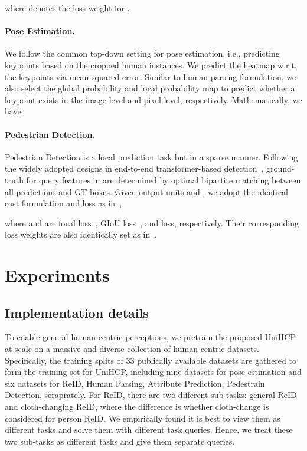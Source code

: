 \documentclass[10pt,twocolumn,letterpaper]{article}
\begin{document}
where  denotes the loss weight for .


\paragraph{Pose Estimation.}
We follow the common top-down setting for pose estimation, i.e., predicting keypoints based on the cropped human instances. We predict the heatmap w.r.t. the keypoints via mean-squared error. Similar to human parsing formulation, we also select the global probability   and local probability map  to predict whether a keypoint exists in the image level and pixel level, respectively. Mathematically, we have:



\paragraph{Pedestrian Detection.}
Pedestrian Detection is a local prediction task but in a sparse manner. 
Following the widely adopted designs in end-to-end transformer-based detection~\cite{carion2020end,zheng2022progressive}, ground-truth for  query features in  are determined by optimal bipartite matching between all  predictions and GT boxes. Given output units  and , we adopt the identical cost formulation and loss as in~\cite{zheng2022progressive},

where   and  are focal loss~\cite{lin2017focal}, GIoU loss~\cite{rezatofighi2019generalized}, and  loss, respectively. Their corresponding loss weights  are also identically set as in~\cite{zheng2022progressive}.  




\section{Experiments}
\label{sec:exps}
\subsection{Implementation details}
To enable general human-centric perceptions, we pretrain the proposed UniHCP at scale on a massive and diverse collection of human-centric datasets. Specifically, the training splits of 33 publically available datasets are gathered to form the training set for UniHCP, including nine datasets for pose estimation and six datasets for ReID, Human Parsing, Attribute Prediction, Pedestrain Detection, seraprately. 
For ReID, there are two different sub-tasks: general ReID and cloth-changing ReID, where the difference is whether cloth-change is considered for person ReID. We empirically found it is best to view them as different tasks and solve them with different task queries. Hence, we treat these two sub-tasks as different tasks and give them separate queries. 
\end{document}
